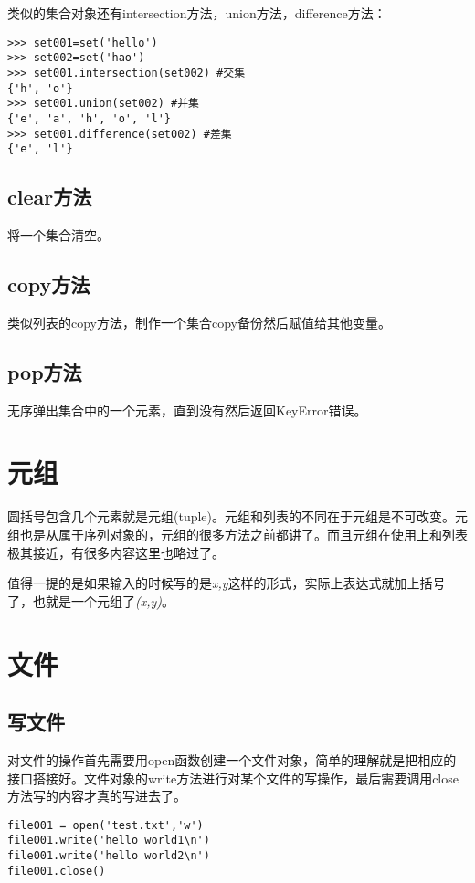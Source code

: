 \documentclass[12pt,oneside]{book}
\begin{document}
\begin{common-format}
类似的集合对象还有intersection方法，union方法，difference方法：
\begin{Verbatim}
>>> set001=set('hello')
>>> set002=set('hao')
>>> set001.intersection(set002) #交集
{'h', 'o'}
>>> set001.union(set002) #并集
{'e', 'a', 'h', 'o', 'l'}
>>> set001.difference(set002) #差集
{'e', 'l'}
\end{Verbatim}


\subsection{clear方法}
将一个集合清空。

\subsection{copy方法}
类似列表的copy方法，制作一个集合copy备份然后赋值给其他变量。

\subsection{pop方法}
无序弹出集合中的一个元素，直到没有然后返回KeyError错误。



\section{元组}
圆括号包含几个元素就是元组(tuple)。元组和列表的不同在于元组是不可改变。元组也是从属于序列对象的，元组的很多方法之前都讲了。而且元组在使用上和列表极其接近，有很多内容这里也略过了。

值得一提的是如果输入的时候写的是\textit{x,y}这样的形式，实际上表达式就加上括号了，也就是一个元组了\textit{(x,y)}。




\section{文件}

\subsection{写文件}
对文件的操作首先需要用open函数创建一个文件对象，简单的理解就是把相应的接口搭接好。文件对象的write方法进行对某个文件的写操作，最后需要调用close方法写的内容才真的写进去了。

\begin{Verbatim}
file001 = open('test.txt','w')
file001.write('hello world1\n')
file001.write('hello world2\n')
file001.close()
\end{Verbatim}


\end{common-format}
\end{document}

